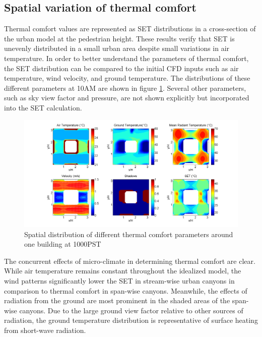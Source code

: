 \documentclass[preprint,3p,12pt,english]{elsarticle}
\begin{document}
\subsection{Spatial variation of thermal comfort}

Thermal comfort values are represented as SET distributions in a cross-section of the urban model at the pedestrian height. These results verify that SET is unevenly distributed in a small urban area despite small variations in air temperature. In order to better understand the parameters of thermal comfort, the SET distribution can be compared to the initial CFD inputs such as air temperature, wind velocity, and ground temperature. The distributions of these different parameters at 10AM are shown in figure \ref{Fig.Parameters}. Several other parameters, such as sky view factor and pressure, are not shown explicitly but incorporated into the SET calculation.  

\begin{figure}[H] \centering  
\graphicspath{ {image/} }
\includegraphics[width=14cm]{1000PST_flux.png}
\hskip 0.5in
\caption{Spatial distribution of different thermal comfort parameters around one building at 1000PST} 
\label{Fig.Parameters}
\end{figure}

The concurrent effects of micro-climate in determining thermal comfort are clear. While air temperature remains constant throughout the idealized model, the wind patterns significantly lower the SET in stream-wise urban canyons in comparison to thermal comfort in span-wise canyons. Meanwhile, the effects of radiation from the ground are most prominent in the shaded areas of the span-wise canyons. Due to the large ground view factor relative to other sources of radiation, the ground temperature distribution is representative of surface heating from short-wave radiation. 
\end{document}
